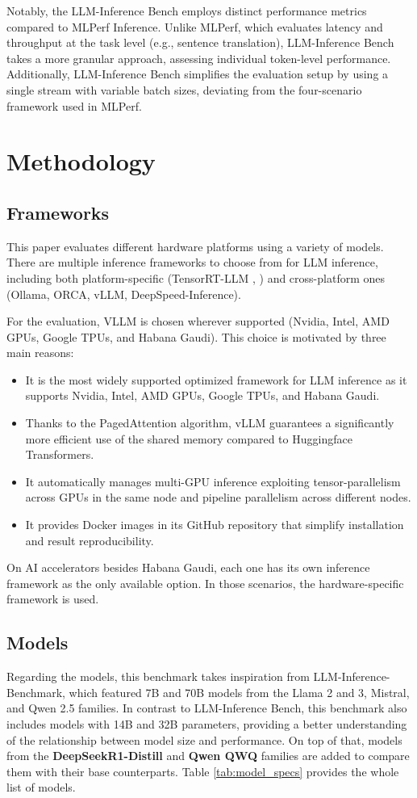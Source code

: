 \documentclass[conference]{IEEEtran}
\begin{document}
Notably, the LLM-Inference Bench employs distinct performance metrics compared to MLPerf Inference. Unlike MLPerf, which evaluates latency and throughput at the task level (e.g., sentence translation), LLM-Inference Bench takes a more granular approach, assessing individual token-level performance. Additionally, LLM-Inference Bench simplifies the evaluation setup by using a single stream with variable batch sizes, deviating from the four-scenario framework used in MLPerf.

\section{Methodology}
\subsection{Frameworks}
This paper evaluates different hardware platforms using a variety of models.
There are multiple inference frameworks to choose from for LLM inference, including both platform-specific (TensorRT-LLM \cite{}, ) and cross-platform ones (Ollama, ORCA, vLLM, DeepSpeed-Inference). 

For the evaluation, VLLM is chosen wherever supported (Nvidia, Intel, AMD GPUs, Google TPUs, and Habana Gaudi). This choice is motivated by three main reasons:
\begin{itemize}
    \item It is the most widely supported optimized framework for LLM inference as it supports Nvidia, Intel, AMD GPUs, Google TPUs, and Habana Gaudi.
    \item Thanks to the PagedAttention algorithm, vLLM guarantees a significantly more efficient use of the shared memory compared to Huggingface Transformers.
    \item It automatically manages multi-GPU inference exploiting tensor-parallelism across GPUs in the same node and pipeline parallelism across different nodes.
    \item It provides Docker images in its GitHub repository that simplify installation and result reproducibility.
\end{itemize}

On AI accelerators besides Habana Gaudi, each one has its own inference framework as the only available option. In those scenarios, the hardware-specific framework is used.

\subsection{Models}
Regarding the models, this benchmark takes inspiration from LLM-Inference-Benchmark\cite{LLMInfbench}, which featured 7B and 70B models from the Llama 2 and 3, Mistral, and Qwen 2.5 families.
In contrast to LLM-Inference Bench, this benchmark also includes models with 14B and 32B parameters, providing a better understanding of the relationship between model size and performance.
On top of that, models from the \textbf{DeepSeekR1-Distill} and\textbf{ Qwen QWQ} families are added to compare them with their base counterparts. Table \ref{tab:model_specs} provides the whole list of models.
\end{document}
